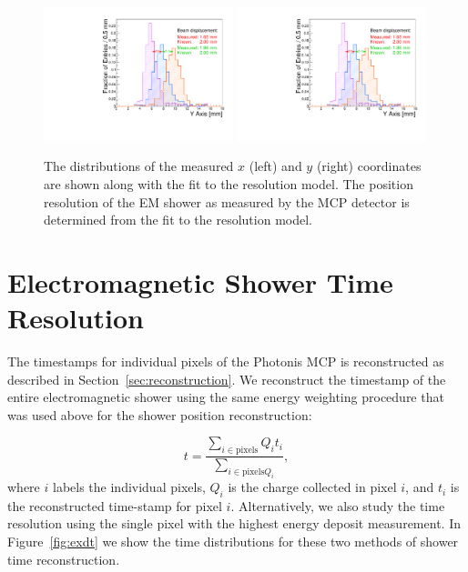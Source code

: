 \documentclass[12pt]{article}
\begin{document}
{\begin{figure}[htbp]
	\centering
	\includegraphics[width=0.49\textwidth]{Images/centers/superimposed.pdf}
	\includegraphics[width=0.49\textwidth]{Images/centers/superimposed.pdf}
	\caption{ The distributions of the measured $x$ (left) and $y$ (right) coordinates are shown 
	along with the fit to the resolution model. The position resolution of the EM shower
	as measured by the MCP detector is determined from the fit to the resolution 
	model.  }
	\label{fig:ResolutionMeasurement}
\end{figure}



\section{ Electromagnetic Shower Time Resolution }

The timestamps for individual pixels of the Photonis MCP is reconstructed as
described in Section~\ref{sec:reconstruction}. We reconstruct the timestamp of
the entire electromagnetic shower using the same energy weighting procedure that
was used above for the shower position reconstruction:

\begin{equation} t =\frac{\sum_{i\in\mathrm{pixels}} Q_{i} t_{i}}
{\sum_{i\in\mathrm{pixels} Q_{i}}}, \label{eqn:EnergyWeightedTimestamp}
\end{equation} where $i$ labels the individual pixels, $Q_{i}$ is the charge
collected in pixel $i$, and $t_{i}$ is the reconstructed time-stamp for pixel
$i$. Alternatively, we also study the time resolution using the single pixel
with the highest energy deposit measurement. In Figure~\ref{fig:exdt} we show
the time distributions for these two methods of shower time reconstruction.

}
\end{document}
